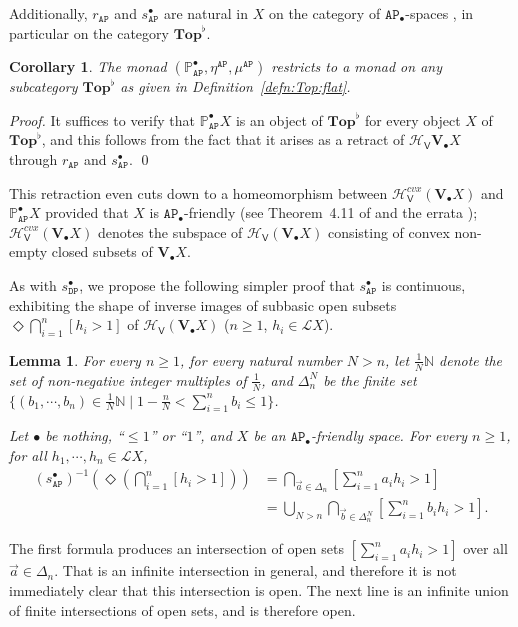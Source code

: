 \documentclass[preprint,12pt]{elsarticle}
\newcommand\nat{\mathbb{N}}
\newcommand\Lform{\mathcal L}
\newcommand\Pred{\mathbb{P}}
\newcommand\Angel{{\mathtt{A}}}
\newcommand\Demon{{\mathtt{D}}}
\newcommand\Nature{{\mathtt{P}}}
\newcommand\AN{{\Angel\Nature}}
\newcommand\DN{{\Demon\Nature}}
\newcommand\Hoare{{\mathcal H}}
\newcommand\Vt{\mathsf{V}}
\newcommand\HV{\Hoare_\Vt}
\newcommand\Val{{\mathbf V}}
\newcommand\Topcat{\mathbf{Top}}
\newtheorem{corollary}[theorem]{Corollary}
\newtheorem{lemma}[theorem]{Lemma}
\begin{document}
Additionally, $r_\AN$ and $s_\AN^\bullet$ are natural in $X$ on the
category of $\AN_\bullet$-spaces \cite[Lemma~13.2]{JGL:projlim:prev},
in particular on the category $\Topcat^\flat$.

\begin{corollary}
  \label{corl:AN:monad:flat}
  The monad $(\Pred_\AN^\bullet, \allowbreak \eta^\AN, \allowbreak
  \mu^\AN)$ restricts to a monad on any subcategory $\Topcat^\flat$ as
  given in Definition~\ref{defn:Top:flat}.
\end{corollary}
\begin{proof}
  It suffices to verify that $\Pred_\AN^\bullet X$ is an object of
  $\Topcat^\flat$ for every object $X$ of $\Topcat^\flat$, and this
  follows from the fact that it arises as a retract of $\HV
  {\Val_\bullet X}$ through $r_\AN$ and $s_\AN^\bullet$.  \qed
\end{proof}

This retraction even cuts down to a homeomorphism between
$\HV^{cvx} (\Val_\bullet X)$ and $\Pred_\AN^\bullet X$ provided that
$X$ is $\AN_\bullet$-friendly (see Theorem~4.11 of
\cite[Theorem~4.11]{JGL-mscs16} and the errata
\cite{JGL:mscs16:errata}); $\HV^{cvx} (\Val_\bullet X)$ denotes the
subspace of $\HV (\Val_\bullet X)$ consisting of convex non-empty
closed subsets of $\Val_\bullet X$.

As with $s_\DN^\bullet$, we propose the following simpler proof that
$s_\AN^\bullet$ is continuous, exhibiting the shape of inverse images
of subbasic open subsets $\Diamond {\bigcap_{i=1}^n [h_i > 1]}$ of
$\HV (\Val_\bullet X)$ ($n \geq 1$, $h_i \in \Lform X$).
\begin{lemma}
  \label{lemma:sAP:inv:func}
  For every $n \geq 1$, for every natural number $N > n$, let
  $\frac 1 N \nat$ denote the set of non-negative integer multiples of
  $\frac 1 N$, and $\Delta_n^N$ be the finite set
  $\{(b_1, \cdots, b_n) \in \frac 1 N \nat \mid 1 - \frac n N <
  \sum_{i=1}^n b_i \leq 1\}$.

  Let $\bullet$ be nothing, ``$\leq 1$'' or ``$1$'', and $X$ be an
  $\AN_\bullet$-friendly space.  For every
  $n \geq 1$, for all $h_1, \cdots, h_n \in \Lform X$,
  \begin{align*}
    {(s_\AN^\bullet)}^{-1} (\Diamond {(\bigcap_{i=1}^n [h_i > 1])})
    & = \bigcap_{\vec a \in \Delta_n} \left[\sum_{i=1}^n a_i h_i >
      1\right] \\
    & = \bigcup_{N > n} \bigcap_{\vec b \in \Delta_n^N} \left[\sum_{i=1}^n b_i h_i >
      1\right].
  \end{align*}
\end{lemma}
The first formula produces an intersection of open sets
$[\sum_{i=1}^n a_i h_i > 1]$ over all $\vec a \in \Delta_n$.  That is
an infinite intersection in general, and therefore it is not
immediately clear that this intersection is open.  The next line is an
infinite union of finite intersections of open sets, and is therefore
open.
\end{document}
